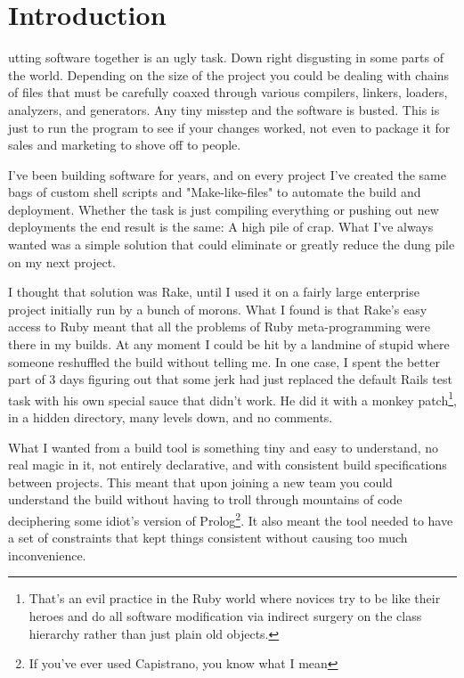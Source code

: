 \chapter{Introduction}
\label{chapter:Introduction}

utting software together is an ugly task.  Down right disgusting in
some parts of the world.  Depending on the size of the project you could be
dealing with chains of files that must be carefully coaxed through various
compilers, linkers, loaders, analyzers, and generators.  Any tiny misstep and
the software is busted.  This is just to run the program to see if your changes
worked, not even to package it for sales and marketing to shove off to people.

I've been building software for years, and on every project I've created the
same bags of custom shell scripts and "Make-like-files" to automate the build
and deployment.  Whether the task is just compiling everything or pushing out
new deployments the end result is the same: A high pile of crap.  What I've
always wanted was a simple solution that could eliminate or greatly reduce the
dung pile on my next project.

I thought that solution was Rake, until I used it on a fairly large enterprise
project initially run by a bunch of morons.  What I found is that Rake's easy
access to Ruby meant that all the problems of Ruby meta-programming were there
in my builds.  At any moment I could be hit by a landmine of stupid where
someone reshuffled the build without telling me.  In one case, I spent the
better part of 3 days figuring out that some jerk had just replaced the default
Rails test task with his own special sauce that didn't work.  He did it with a
monkey patch\footnote{That's an evil practice in the Ruby world where novices
    try to be like their heroes and do all software modification via indirect
        surgery on the class hierarchy rather than just plain old objects.}, 
in a hidden directory, many levels down, and no comments.

What I wanted from a build tool is something tiny and easy to understand, no
real magic in it, not entirely declarative, and with consistent build
specifications between projects.  This meant that upon joining a new team you
could understand the build without having to troll through mountains of code
deciphering some idiot's version of Prolog\footnote{If you've ever used
    Capistrano, you know what I mean}.
It also meant the tool needed to have a set of constraints that kept things
consistent without causing too much inconvenience.

